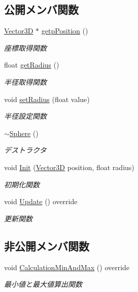 \subsection*{公開メンバ関数}
\begin{DoxyCompactItemize}
\item 
\mbox{\hyperlink{class_vector3_d}{Vector3D}} $\ast$ \mbox{\hyperlink{class_sphere_ad1885bd0628ecd509ea2a61918875bd1}{getp\+Position}} ()
\begin{DoxyCompactList}\small\item\em 座標取得関数 \end{DoxyCompactList}\item 
float \mbox{\hyperlink{class_sphere_a330dd34c7c7b6dfff106c4c71ec80028}{get\+Radius}} ()
\begin{DoxyCompactList}\small\item\em 半径取得関数 \end{DoxyCompactList}\item 
void \mbox{\hyperlink{class_sphere_ad813f5d3e9da96cf1111aedec4ec9b5f}{set\+Radius}} (float value)
\begin{DoxyCompactList}\small\item\em 半径設定関数 \end{DoxyCompactList}\item 
\mbox{\hyperlink{class_sphere_a569c071e50a3e11f678630ee1a17737e}{$\sim$\+Sphere}} ()
\begin{DoxyCompactList}\small\item\em デストラクタ \end{DoxyCompactList}\item 
void \mbox{\hyperlink{class_sphere_aa0c93894c5dad170bd65f1cec3493c37}{Init}} (\mbox{\hyperlink{class_vector3_d}{Vector3D}} position, float radius)
\begin{DoxyCompactList}\small\item\em 初期化関数 \end{DoxyCompactList}\item 
void \mbox{\hyperlink{class_sphere_a5e72970f207683a3cf5fe430f6a62e15}{Update}} () override
\begin{DoxyCompactList}\small\item\em 更新関数 \end{DoxyCompactList}\end{DoxyCompactItemize}
\subsection*{非公開メンバ関数}
\begin{DoxyCompactItemize}
\item 
void \mbox{\hyperlink{class_sphere_a651b659cec38a3a93a4be589f25899d7}{Calculation\+Min\+And\+Max}} () override
\begin{DoxyCompactList}\small\item\em 最小値と最大値算出関数 \end{DoxyCompactList}\end{DoxyCompactItemize}

